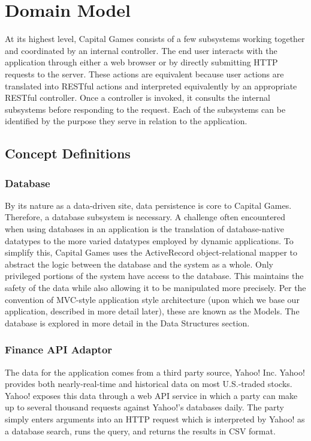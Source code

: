 \chapter{Domain Model}

\iffalse
At its highest level, Capital Games consists of a few subsystems
working together and coordinated by an internal controller. The
end user interacts with the application through either a web browser
or by directly submitting HTTP requests to the server. These actions
are equivalent because user actions are translated into RESTful actions
and interpreted equivalently by an appropriate RESTful controller. \cite{wiki:restful}
Once a controller is invoked, it consults the 
internal subsystems before responding to the request. Each of the 
subsystems can be identified by the purpose they serve in relation
to the application. 

\section{Concept Definitions}

\subsection{Database}
By its nature as a data-driven site, data persistence
is core to Capital Games. Therefore, a database subsystem is necessary. 
A challenge often encountered when using databases in an application is
the translation of database-native datatypes to the more varied datatypes
employed by dynamic applications. \cite{wiki:orm} To simplify this,
Capital Games uses the ActiveRecord object-relational mapper to abstract
the logic between the database and the system as a whole. Only privileged portions
of the system have access to the database. This maintains the safety of the
data while also allowing it to be manipulated more precisely. Per the convention
of MVC-style application style architecture 
(upon which we base our application, described in more detail later), these 
are known as the Models. The database is explored in more detail in the Data Structures section.

\subsection{Finance API Adaptor}
The data for the application comes from a third party source, Yahoo! Inc. Yahoo!
provides both nearly-real-time and historical data on most U.S.-traded stocks.
Yahoo! exposes this data through a web API service in which a party can make
up to several thousand requests against Yahoo!'s databases daily. The party
simply enters arguments into an HTTP request which is interpreted by Yahoo!
as a database search, runs the query, and returns the results in CSV format. \cite{gummy}

